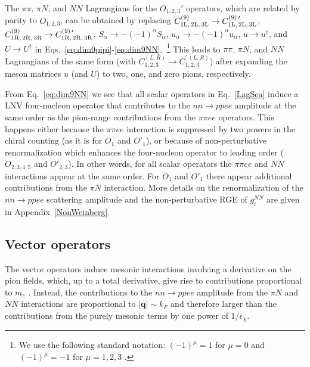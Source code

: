 \documentclass[letterpaper,11pt]{article}
\newcommand{\al}{\alpha}
\renewcommand{\vec}[1]{{\mathbf #1}}
\begin{document}
The  $\pi\pi$, $\pi N$, and $N\!N$ Lagrangians for the $O_{1,2,3}'$ operators, which are related by parity to $O_{1,2,3}$, can  be obtained by replacing $C_{\rm 1L,\, 2L,\,3L}^{(9)}\to C_{\rm 1L,\,2L,\,3L}^{(9)\, \prime}$, $C_{\rm 1R,\, 2R,\,3R}^{(9)}\to C_{\rm 1R,\,2R,\,3R}^{(9)\, \prime}$, 
$S_\al \to  - (-1)^\al S_\al$, 
$u_\al \to  - (-1)^\al u_\al$,
$u\to u^\dagger$, and $U\to U^\dagger$ in Eqs.\ \eqref{eq:dim9pipi}-\eqref{eq:dim9NN}.~\footnote{We use the following standard notation:
$(-1)^\mu = 1$ for $\mu=0$ and 
$(-1)^\mu = - 1$ for $\mu=1,2,3$ \cite{Peskin:1995ev}.} 
This leads to $\pi\pi$, $\pi N$, and $NN$ Lagrangians of the same form (with $C_{1,2,3}^{(L,R)}\to C_{1,2,3}^{\prime\,(L,R)}$) after expanding the meson matrices $u$ (and $U$) to two, one, and zero pions, respectively. 

From Eq.~\eqref{eq:dim9NN} we see that all scalar operators in Eq.~\eqref{LagSca} induce a LNV four-nucleon operator that contributes to the  $nn \rightarrow pp e e$ amplitude at the same order as the pion-range contributions from the $\pi\pi ee$ operators. This happens either because the $\pi\pi ee$ interaction is suppressed by two powers in the chiral counting (as it is for $O_1$ and $O'_1$), or because of non-perturbative renormalization which enhances the four-nucleon operator to leading order ($O_{2,3,4,5}$ and $O'_{2,3}$). In other words, for all scalar operators the $\pi\pi ee$ and $NN$ interactions appear at the same order. For $O_1$ and $O'_1$ there appear additional contributions from the $\pi N$ interaction. More details on the renormalization of the $nn \rightarrow p p e e$ scattering amplitude and the non-perturbative RGE of $g_i^{NN}$ are given in Appendix~\ref{NonWeinberg}.




\subsection{Vector operators}\label{ChiPTvector}
The vector operators induce mesonic interactions involving a derivative on the pion fields, which, up to a total derivative, give rise to contributions proportional to $m_e$ \cite{Graesser:2016bpz,Prezeau:2003xn}. Instead, the contributions to the $nn\to pp ee$ amplitude from the $\pi N$ and $N\!N$ interactions are proportional to $|\vec q|\sim k_F$ and therefore larger than the contributions from the purely mesonic terms by one power of $1/\epsilon_\chi$.
\end{document}
